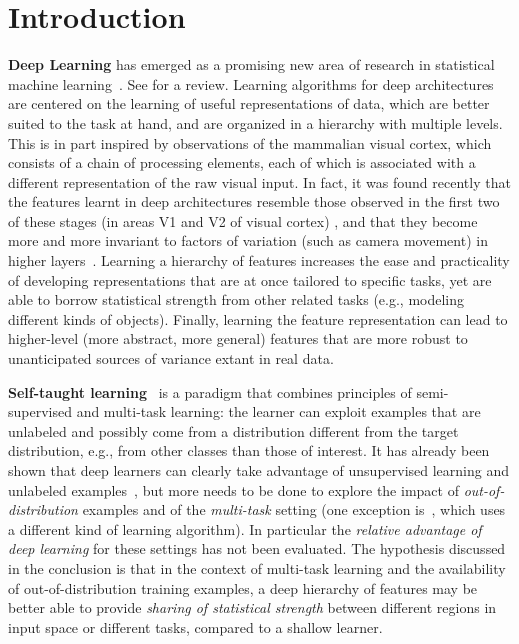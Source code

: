 \documentclass{article} %
\begin{document}
\section{Introduction}

{\bf Deep Learning} has emerged as a promising new area of research in
statistical machine learning~\citep{Hinton06,ranzato-07-small,Bengio-nips-2006,VincentPLarochelleH2008,ranzato-08,TaylorHintonICML2009,Larochelle-jmlr-2009,Salakhutdinov+Hinton-2009,HonglakL2009,HonglakLNIPS2009,Jarrett-ICCV2009,Taylor-cvpr-2010}. See \citet{Bengio-2009} for a review.
Learning algorithms for deep architectures are centered on the learning
of useful representations of data, which are better suited to the task at hand,
and are organized in a hierarchy with multiple levels.
This is in part inspired by observations of the mammalian visual cortex, 
which consists of a chain of processing elements, each of which is associated with a
different representation of the raw visual input. In fact,
it was found recently that the features learnt in deep architectures resemble
those observed in the first two of these stages (in areas V1 and V2
of visual cortex) \citep{HonglakL2008}, and that they become more and
more invariant to factors of variation (such as camera movement) in
higher layers~\citep{Goodfellow2009}.
Learning a hierarchy of features increases the
ease and practicality of developing representations that are at once
tailored to specific tasks, yet are able to borrow statistical strength
from other related tasks (e.g., modeling different kinds of objects). Finally, learning the
feature representation can lead to higher-level (more abstract, more
general) features that are more robust to unanticipated sources of
variance extant in real data.

{\bf Self-taught learning}~\citep{RainaR2007} is a paradigm that combines principles
of semi-supervised and multi-task learning: the learner can exploit examples
that are unlabeled and possibly come from a distribution different from the target
distribution, e.g., from other classes than those of interest. 
It has already been shown that deep learners can clearly take advantage of
unsupervised learning and unlabeled examples~\citep{Bengio-2009,WestonJ2008-small},
but more needs to be done to explore the impact
of {\em out-of-distribution} examples and of the {\em multi-task} setting
(one exception is~\citep{CollobertR2008}, which uses a different kind
of learning algorithm). In particular the {\em relative
advantage of deep learning} for these settings has not been evaluated.
The hypothesis discussed in the conclusion is that in the context of 
multi-task learning and the availability of out-of-distribution training examples, 
a deep hierarchy of features
may be better able to provide {\em sharing of statistical strength}
between different regions in input space or different tasks, compared to
a shallow learner.
\end{document}

